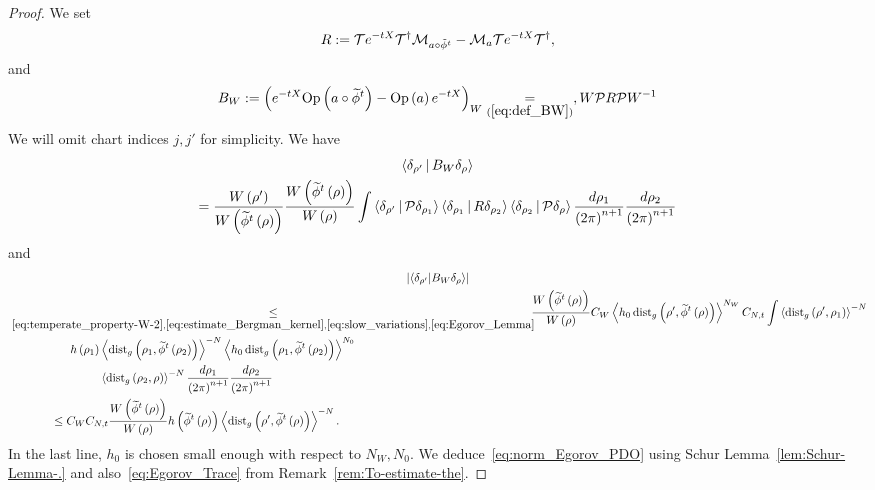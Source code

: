 \documentclass[AHL,Unicode,longabstracts,published]{cedram}
\newcommand*\eq[1]{\underset{(#1)}{=}}
\newcommand{\clT}{\mathcal{T}}
\newcommand{\clM}{\mathcal{M}}
\newcommand{\clP}{\mathcal{P}}
\newcommand{\dist}{\mathrm{dist}}
\newcommand{\Opp}{\mathrm{Op}}
\let\oldtilde\tilde
\renewcommand*{\tilde}[1]{\mathchoice{\widetilde{#1}}{\widetilde{#1}}{\oldtilde{#1}}{\oldtilde{#1}}}
\begin{document}
\begin{proof}
We set
\[
R:=\clT e^{-tX}\clT^{\dagger}\clM_{a\circ\tilde{\phi}^{t}}-\clM_{a}\clT e^{-tX}\clT^{\dagger},
\]
and
\[
B_{W}:=\left(e^{-tX}\Opp \left(a\circ\tilde{\phi}^{t}\right)-\Opp \left(a\right)e^{-tX}\right)_{W}\eq{\ref{eq:def_BW}}, W\clP R\clP W^{-1}
\]
We will omit chart indices $j,j'$ for simplicity. We have
\begin{multline*}
\left\langle\delta_{\rho'}\,\middle|\,B_{W}\delta_{\rho}\right\rangle \\
 =\frac{W\left(\rho'\right)}{W\left(\tilde{\phi}^{t}\left(\rho\right)\right)}\frac{W\left(\tilde{\phi}^{t}\left(\rho\right)\right)}{W\left(\rho\right)}\int\left\langle\delta_{\rho'}\,\middle|\,\clP \delta_{\rho_{1}}\right\rangle\left\langle\delta_{\rho_{1}}\,\middle|\,R\delta_{\rho_{2}}\right\rangle\left\langle\delta_{\rho_{2}}\,\middle|\,\clP \delta_{\rho}\right\rangle\frac{d\rho_{1}}{\left(2\pi\right)^{n+1}}\frac{d\rho_{2}}{\left(2\pi\right)^{n+1}}
\end{multline*}
and
\begin{multline*}
\left|\langle\delta_{\rho'}|B_{W}\delta_{\rho}\rangle\right|\\
\begin{aligned}
&\underset{\eqref{eq:temperate_property-W-2},\eqref{eq:estimate_Bergman_kernel},\eqref{eq:slow_variations},\eqref{eq:Egorov_Lemma}}{\leq}  \mkern-10mu\frac{W\left(\tilde{\phi}^{t}\left(\rho\right)\right)}{W\left(\rho\right)}C_{W}\left\langle h_{0}\,\dist_{g}\left(\rho',\tilde{\phi}^{t}\left(\rho\right)\right)\right\rangle ^{N_{W}}C_{N,t}\int\left\langle \dist_{g}\left(\rho',\rho_{1}\right)\right\rangle ^{-N}\\
&\mkern95mu h\left(\rho_{1}\right)\left\langle \dist_{g}\left(\rho_{1},\tilde{\phi}^{t}\left(\rho_{2}\right)\right)\right\rangle ^{-N}  \left\langle h_{0}\,\dist_{g}\left(\rho_{1},\tilde{\phi}^{t}\left(\rho_{2}\right)\right)\right\rangle ^{N_{0}}\\
&\mkern140mu \left\langle \dist_{g}\left(\rho_{2},\rho\right)\right\rangle ^{-N}\frac{d\rho_{1}}{\left(2\pi\right)^{n+1}}\frac{d\rho_{2}}{\left(2\pi\right)^{n+1}}\\
&\mkern65mu\leq C_{W} C_{N,t}\frac{W\left(\tilde{\phi}^{t}\left(\rho\right)\right)}{W\left(\rho\right)}h\left(\tilde{\phi}^{t}\left(\rho\right)\right)\left\langle \dist_{g}\left(\rho',\tilde{\phi}^{t}\left(\rho\right)\right)\right\rangle ^{-N}.
\end{aligned}
\end{multline*}
In the last line, $h_{0}$ is chosen small enough with respect to $N_{W},N_{0}$. We deduce~\eqref{eq:norm_Egorov_PDO} using Schur Lemma~\ref{lem:Schur-Lemma-.} and also~\eqref{eq:Egorov_Trace} from Remark~\ref{rem:To-estimate-the}.
\end{proof}
\end{document}
